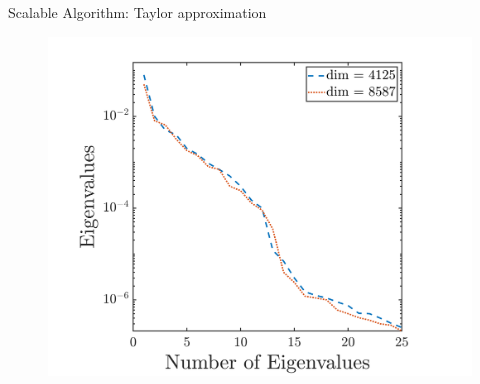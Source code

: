 \documentclass[10pt,xcolor=dvipsnames,compress]{beamer}
\begin{document}
\begin{frame}{Scalable Algorithm: Taylor approximation}
\begin{minipage}{0.49\textwidth}
\begin{itemize}
\end{itemize}
\end{minipage}
\hfill
\begin{minipage}{0.5\textwidth}
\begin{figure}[H]
\centering
\includegraphics[trim = 0mm 0mm 0mm 0mm, clip,width=0.95\linewidth]{Figures/Eigenvalue_1.png}
\end{figure}
\end{minipage}

\vfill
\scriptsize
{}

\end{frame}
\end{document}
